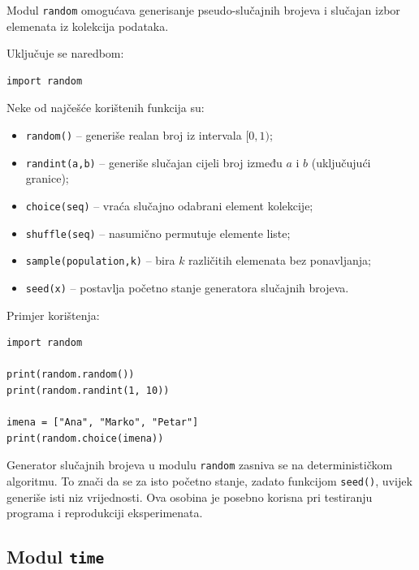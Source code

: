 Modul \texttt{random} omogućava generisanje pseudo-slučajnih brojeva i slučajan izbor elemenata iz kolekcija podataka.

Uključuje se naredbom:

\begin{verbatim}
import random
\end{verbatim}

Neke od najčešće korištenih funkcija su:

\begin{itemize}
	\item \texttt{random()} -- generiše realan broj iz intervala $[0,1)$;
	\item \texttt{randint(a,b)} -- generiše slučajan cijeli broj između $a$ i $b$ (uključujući granice);
	\item \texttt{choice(seq)} -- vraća slučajno odabrani element kolekcije;
	\item \texttt{shuffle(seq)} -- nasumično permutuje elemente liste;
	\item \texttt{sample(population,k)} -- bira $k$ različitih elemenata bez ponavljanja;
	\item \texttt{seed(x)} -- postavlja početno stanje generatora slučajnih brojeva.
\end{itemize}

Primjer korištenja:

\begin{verbatim}
import random

print(random.random())
print(random.randint(1, 10))

imena = ["Ana", "Marko", "Petar"]
print(random.choice(imena))
\end{verbatim}

Generator slučajnih brojeva u modulu \texttt{random} zasniva se na determinističkom algoritmu. To znači da se za isto početno stanje, zadato funkcijom \texttt{seed()}, uvijek generiše isti niz vrijednosti. Ova osobina je posebno korisna pri testiranju programa i reprodukciji eksperimenata.



\subsection{Modul \texttt{time}}

